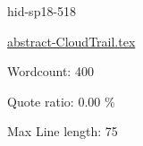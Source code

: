 








\begin{IU}

hid-sp18-518

\href{https://github.com/cloudmesh-community/hid-sp18-518/blob/master//technology/abstract-CloudTrail.tex}{abstract-CloudTrail.tex}

 

Wordcount: 400


Quote ratio: 0.00 \%
 
Max Line length: 75
\end{IU}

